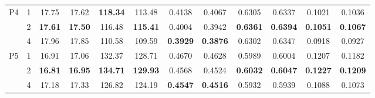 \begin{table}[ht]
{\begin{tabular}{cccccccccccc}
\multicolumn{1}{c|}{\multirow{3}{*}{P4}} & \multicolumn{1}{c|}{1}    & \multicolumn{1}{c|}{17.75}          & \multicolumn{1}{c|}{17.62}          & \multicolumn{1}{c|}{\textbf{118.34}} & \multicolumn{1}{c|}{113.48}          & \multicolumn{1}{c|}{0.4138}          & \multicolumn{1}{c|}{0.4067}          & \multicolumn{1}{c|}{0.6305}          & \multicolumn{1}{c|}{0.6337}          & \multicolumn{1}{c|}{0.1021}          & 0.1036          \\
\multicolumn{1}{c|}{}                    & \multicolumn{1}{c|}{2}    & \multicolumn{1}{c|}{\textbf{17.61}} & \multicolumn{1}{c|}{\textbf{17.50}} & \multicolumn{1}{c|}{116.48}          & \multicolumn{1}{c|}{\textbf{115.41}} & \multicolumn{1}{c|}{0.4004}          & \multicolumn{1}{c|}{0.3942}          & \multicolumn{1}{c|}{\textbf{0.6361}} & \multicolumn{1}{c|}{\textbf{0.6394}} & \multicolumn{1}{c|}{\textbf{0.1051}} & \textbf{0.1067} \\
\multicolumn{1}{c|}{}                    & \multicolumn{1}{c|}{4}    & \multicolumn{1}{c|}{17.96}          & \multicolumn{1}{c|}{17.85}          & \multicolumn{1}{c|}{110.58}          & \multicolumn{1}{c|}{109.59}          & \multicolumn{1}{c|}{\textbf{0.3929}} & \multicolumn{1}{c|}{\textbf{0.3876}} & \multicolumn{1}{c|}{0.6302}          & \multicolumn{1}{c|}{0.6347}          & \multicolumn{1}{c|}{0.0918}          & 0.0927          \\ \hline
\multicolumn{1}{c|}{\multirow{3}{*}{P5}} & \multicolumn{1}{c|}{1}    & \multicolumn{1}{c|}{16.91}          & \multicolumn{1}{c|}{17.06}          & \multicolumn{1}{c|}{132.37}          & \multicolumn{1}{c|}{128.71}          & \multicolumn{1}{c|}{0.4670}          & \multicolumn{1}{c|}{0.4628}          & \multicolumn{1}{c|}{0.5989}          & \multicolumn{1}{c|}{0.6004}          & \multicolumn{1}{c|}{0.1207}          & 0.1182          \\
\multicolumn{1}{c|}{}                    & \multicolumn{1}{c|}{2}    & \multicolumn{1}{c|}{\textbf{16.81}} & \multicolumn{1}{c|}{\textbf{16.95}} & \multicolumn{1}{c|}{\textbf{134.71}} & \multicolumn{1}{c|}{\textbf{129.93}} & \multicolumn{1}{c|}{0.4568}          & \multicolumn{1}{c|}{0.4524}          & \multicolumn{1}{c|}{\textbf{0.6032}} & \multicolumn{1}{c|}{\textbf{0.6047}} & \multicolumn{1}{c|}{\textbf{0.1227}} & \textbf{0.1209} \\
\multicolumn{1}{c|}{}                    & \multicolumn{1}{c|}{4}    & \multicolumn{1}{c|}{17.18}          & \multicolumn{1}{c|}{17.33}          & \multicolumn{1}{c|}{126.82}          & \multicolumn{1}{c|}{124.19}          & \multicolumn{1}{c|}{\textbf{0.4547}} & \multicolumn{1}{c|}{\textbf{0.4516}} & \multicolumn{1}{c|}{0.5932}          & \multicolumn{1}{c|}{0.5939}          & \multicolumn{1}{c|}{0.1088}          & 0.1073          \\ \hline
\end{tabular}
}
\label{tab:ablation:alpha}
\end{table}
